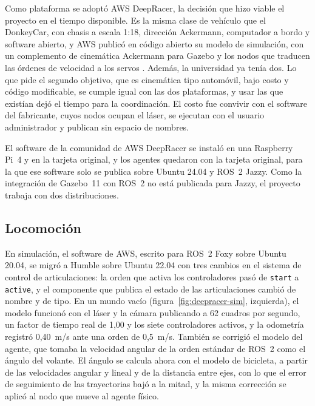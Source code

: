 Como plataforma se adoptó AWS DeepRacer, la decisión que hizo viable el proyecto en el tiempo disponible. Es la misma clase de vehículo que el DonkeyCar, con chasis a escala 1:18, dirección Ackermann, computador a bordo y software abierto, y AWS publicó en código abierto su modelo de simulación, con un complemento de cinemática Ackermann para Gazebo y los nodos que traducen las órdenes de velocidad a los servos \autocite{awsdeepracer2021}. Además, la universidad ya tenía dos. Lo que pide el segundo objetivo, que es cinemática tipo automóvil, bajo costo y código modificable, se cumple igual con las dos plataformas, y usar las que existían dejó el tiempo para la coordinación. El costo fue convivir con el software del fabricante, cuyos nodos ocupan el láser, se ejecutan con el usuario administrador y publican sin espacio de nombres.

El software de la comunidad de AWS DeepRacer \autocite{deepracercustomcar} se instaló en una Raspberry Pi~4 y en la tarjeta original, y los agentes quedaron con la tarjeta original, para la que ese software solo se publica sobre Ubuntu 24.04 y ROS~2 Jazzy. Como la integración de Gazebo~11 con ROS~2 no está publicada para Jazzy, el proyecto trabaja con dos distribuciones.

\subsection{Locomoción}
\label{sec:banda-muerta}
\label{sec:media-vuelta}

En simulación, el software de AWS, escrito para ROS~2 Foxy sobre Ubuntu 20.04, se migró a Humble sobre Ubuntu 22.04 con tres cambios en el sistema de control de articulaciones: la orden que activa los controladores pasó de \texttt{start} a \texttt{active}, y el componente que publica el estado de las articulaciones cambió de nombre y de tipo. En un mundo vacío (figura~\ref{fig:deepracer-sim}, izquierda), el modelo funcionó con el láser y la cámara publicando a 62 cuadros por segundo, un factor de tiempo real de 1,00 y los siete controladores activos, y la odometría registró 0,40~m/s ante una orden de 0,5~m/s. También se corrigió el modelo del agente, que tomaba la velocidad angular de la orden estándar de ROS~2 como el ángulo del volante. El ángulo se calcula ahora con el modelo de bicicleta, a partir de las velocidades angular y lineal y de la distancia entre ejes, con lo que el error de seguimiento de las trayectorias bajó a la mitad, y la misma corrección se aplicó al nodo que mueve al agente físico.

